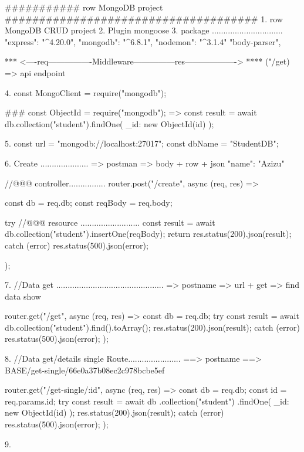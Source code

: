 ########### row MongoDB project #####################################
1. row MongoDB CRUD project
2. Plugin mongoose 
3. package ...............................
    "express": "^4.20.0",
    "mongodb": "^6.8.1",
    "nodemon": "^3.1.4"
    "body-parser",

*** <----req----------------Middleware---------------res-------------------> 
**** ("/get)  => api endpoint 

4. const { MongoClient } = require("mongodb");

### const { ObjectId } = require("mongodb");
   => const result = await db.collection("student").findOne({ _id: new ObjectId(id) });

5. const url = "mongodb://localhost:27017";
   const dbName = "StudentDB";


6. Create .....................
   => postman => body + row + json {"name": "Azizu"}

   //@@@ controller................
   router.post("/create", async (req, res) => {
  const db = req.db;
  const reqBody = req.body;

  try {        
    //@@@ resource ..........................
    const result = await db.collection("student").insertOne(reqBody);
    return res.status(200).json(result);
  } catch (error) {
    res.status(500).json(error);
  }
});

7. //Data get ...............................................
   => postname => url + get  => find data show

router.get("/get", async (req, res) => {
  const db = req.db;
  try {
    const result = await db.collection("student").find().toArray();
    res.status(200).json(result);
  } catch (error) {
    res.status(500).json(error);
  }
});

8. //Data get/details single Route.......................
   ==> postname ==> {{BASE}}/get-single/66e0a37b08ec2c978bcbe5ef

router.get("/get-single/:id", async (req, res) => {
  const db = req.db;
  const id = req.params.id;
  try {
    const result = await db
      .collection("student")
      .findOne({ _id: new ObjectId(id) });
    res.status(200).json(result);
  } catch (error) {
    res.status(500).json(error);
  }
});

9. 

